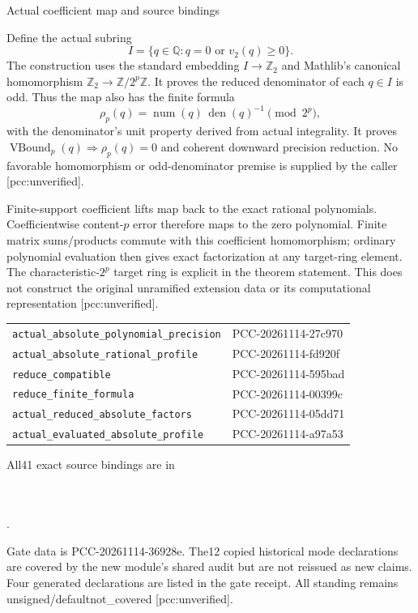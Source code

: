 \documentclass[10pt]{article}
\begin{document}
\newpage
\begin{center}{\Large Actual coefficient map and source bindings}\end{center}
Define the actual subring
\[
 I=\{q\in\mathbb Q:q=0\text{ or }v_2(q)\ge0\}.
\]
The construction uses the standard embedding $I\to\mathbb Z_2$ and Mathlib's
canonical homomorphism $\mathbb Z_2\to\mathbb Z/2^p\mathbb Z$. It proves
the reduced denominator of each $q\in I$ is odd. Thus the map also has the
finite formula
\[
 \rho_p(q)=\operatorname{num}(q)\,
                 \operatorname{den}(q)^{-1}\pmod{2^p},
\]
with the denominator's unit property derived from actual integrality.
It proves $\operatorname{VBound}_p(q)\Rightarrow\rho_p(q)=0$ and coherent
downward precision reduction. No favorable homomorphism or odd-denominator
premise is supplied by the caller [pcc:unverified].

Finite-support coefficient lifts map back to the exact rational polynomials.
Coefficientwise content-$p$ error therefore maps to the zero polynomial.
Finite matrix sums/products commute with this coefficient homomorphism;
ordinary polynomial evaluation then gives exact factorization at any
target-ring element. The characteristic-$2^p$ target ring is explicit in the
theorem statement. This does not construct the original unramified extension
data or its computational representation [pcc:unverified].

\begin{center}\small
\begin{tabular}{p{.66\linewidth}p{.24\linewidth}}
\texttt{actual\_absolute\_polynomial\_precision}&PCC-20261114-27c970\\
\texttt{actual\_absolute\_rational\_profile}&PCC-20261114-fd920f\\
\texttt{reduce\_compatible}&PCC-20261114-595bad\\
\texttt{reduce\_finite\_formula}&PCC-20261114-00399c\\
\texttt{actual\_reduced\_absolute\_factors}&PCC-20261114-05dd71\\
\texttt{actual\_evaluated\_absolute\_profile}&PCC-20261114-a97a53
\end{tabular}
\end{center}
All41 exact source bindings are in
\begin{center}\small
{}\\
\\
.
\end{center}
Gate data is PCC-20261114-36928e. The12 copied historical mode declarations
are covered by the new module's shared audit but are not reissued as new
claims. Four generated declarations are listed in the gate receipt. All
standing remains unsigned/defaultnot\_covered [pcc:unverified].
\end{document}
